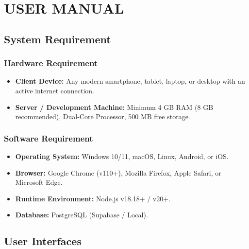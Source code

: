 \documentclass[12pt,a4paper]{report}
\begin{document}
\newpage

\chapter{USER MANUAL}

\section{System Requirement}

\subsection{Hardware Requirement}
\begin{itemize}
    \item \textbf{Client Device:} Any modern smartphone, tablet, laptop, or desktop with an active internet connection.
    \item \textbf{Server / Development Machine:} Minimum 4 GB RAM (8 GB recommended), Dual-Core Processor, 500 MB free storage.
\end{itemize}

\subsection{Software Requirement}
\begin{itemize}
    \item \textbf{Operating System:} Windows 10/11, macOS, Linux, Android, or iOS.
    \item \textbf{Browser:} Google Chrome (v110+), Mozilla Firefox, Apple Safari, or Microsoft Edge.
    \item \textbf{Runtime Environment:} Node.js v18.18+ / v20+.
    \item \textbf{Database:} PostgreSQL (Supabase / Local).
\end{itemize}

\section{User Interfaces}
\end{document}
